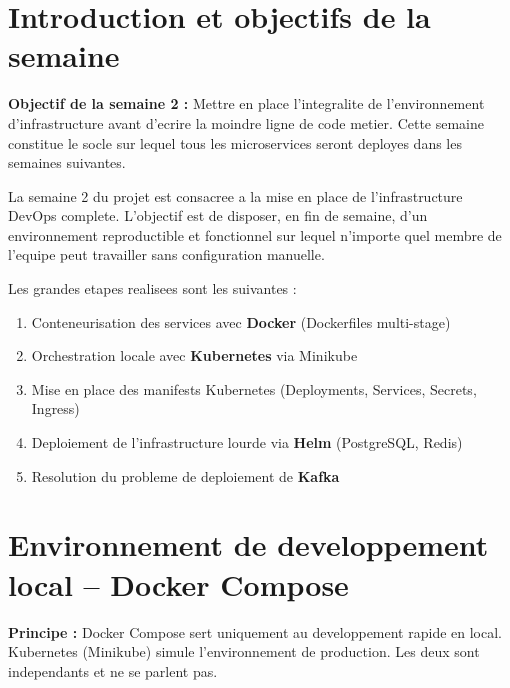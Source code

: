 \documentclass[12pt,a4paper]{article}
\begin{document}
\section{Introduction et objectifs de la semaine}

\begin{infobox}
\textbf{Objectif de la semaine 2 :} Mettre en place l'integralite de l'environnement
d'infrastructure avant d'ecrire la moindre ligne de code metier. Cette semaine constitue
le socle sur lequel tous les microservices seront deployes dans les semaines suivantes.
\end{infobox}

\vspace{0.5cm}

La semaine 2 du projet est consacree a la mise en place de l'infrastructure DevOps
complete. L'objectif est de disposer, en fin de semaine, d'un environnement reproductible
et fonctionnel sur lequel n'importe quel membre de l'equipe peut travailler sans
configuration manuelle.

Les grandes etapes realisees sont les suivantes :

\begin{enumerate}[leftmargin=*, label=\textbf{\arabic*.}]
  \item Conteneurisation des services avec \textbf{Docker} (Dockerfiles multi-stage)
  \item Orchestration locale avec \textbf{Kubernetes} via Minikube
  \item Mise en place des manifests Kubernetes (Deployments, Services, Secrets, Ingress)
  \item Deploiement de l'infrastructure lourde via \textbf{Helm} (PostgreSQL, Redis)
  \item Resolution du probleme de deploiement de \textbf{Kafka}
  
\end{enumerate}

\section{Environnement de developpement local -- Docker Compose}

\begin{infobox}
\textbf{Principe :} Docker Compose sert uniquement au developpement rapide en local.
Kubernetes (Minikube) simule l'environnement de production. Les deux sont independants
et ne se parlent pas.
\end{infobox}
\end{document}

